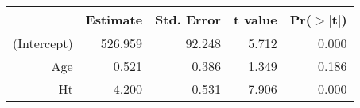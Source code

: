 \begin{table}[ht]
\centering
\begin{tabular}{rrrrr}
  \hline
 & Estimate & Std. Error & t value & Pr($>$$|$t$|$) \\ 
  \hline
(Intercept) & 526.959 & 92.248 & 5.712 & 0.000 \\ 
  Age & 0.521 & 0.386 & 1.349 & 0.186 \\ 
  Ht & -4.200 & 0.531 & -7.906 & 0.000 \\ 
   \hline
\end{tabular}
\end{table}
